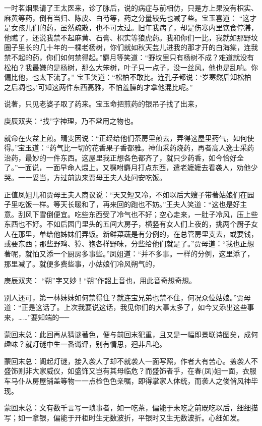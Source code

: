 \begin{parag}
    一时茗烟果请了王太医来，诊了脉后，说的病症与前相仿，只是方上果没有枳实、麻黄等药，倒有当归、陈皮、白芍等，药之分量较先也减了些。宝玉喜道： “这才是女孩儿们的药，虽然疏散，也不可太过。旧年我病了，却是伤寒内里饮食停滞，他瞧了，还说我禁不起麻黄、石膏、枳实等狼虎药。我和你们一比，我就如那野坟圈子里长的几十年的一棵老杨树，你们就如秋天芸儿进我的那才开的白海棠，连我禁不起的药，你们如何禁得起。”麝月等笑道：“野坟里只有杨树不成？难道就没有松柏？我最嫌的是杨树，那么大笨树，叶子只一点子，没一丝风，他也是乱响。你偏比他，也太下流了。” 宝玉笑道：“松柏不敢比。连孔子都说：‘岁寒然后知松柏之后凋也。’可知这两件东西高雅，不怕羞臊的才拿他混比呢。”
\end{parag}


\begin{parag}
    说著，只见老婆子取了药来。宝玉命把煎药的银吊子找了出来，\begin{note}庚辰双夹：“找”字神理，乃不常用之物也。\end{note}就命在火盆上煎。晴雯因说：“正经给他们茶房里煎去，弄得这屋里药气，如何使得。”宝玉道：“药气比一切的花香果子香都雅。神仙采药烧药，再者高人逸士采药治药，最妙的一件东西。这屋里我正想各色都齐了，就只少药香，如今恰好全了。”一面说，一面早命人煨上。又嘱咐麝月打点东西，遣老嬷嬷去看袭人，劝他少哭。一一妥当，方过前边来贾母王夫人处问安吃饭。
\end{parag}


\begin{parag}
    正值凤姐儿和贾母王夫人商议说：“天又短又冷，不如以后大嫂子带著姑娘们在园子里吃饭一样。等天长暖和了，再来回的跑也不妨。”王夫人笑道：“这也是好主意。刮风下雪倒便宜。吃些东西受了冷气也不好；空心走来，一肚子冷风，压上些东西也不好。不如后园门里头的五间大房子，横竖有女人们上夜的，挑两个厨子女人在那里，单给他姊妹们弄饭。新鲜菜蔬是有分例的，在总管房里支去，或要钱，或要东西；那些野鸡、獐、狍各样野味，分些给他们就是了。”贾母道：“我也正想著呢，就怕又添一个厨房多事些。”凤姐道：“并不多事。一样的分例，这里添了，那里减了。就便多费些事，小姑娘们冷风朔气的，\begin{note}庚辰双夹： “朔”字又妙！“朔”作韶上音也，用此音奇想奇想。\end{note}别人还可，第一林妹妹如何禁得住？就连宝兄弟也禁不住，何况众位姑娘。”贾母道：“正是这话了。上次我要说这话，我见你们的大事太多了，如今又添出这些事来，……”要知端的──
\end{parag}


\begin{parag}
    \begin{note}蒙回末总：此回再从猜谜著色，便与前回末犯重，且又是一幅即景联诗图矣，成何趣味？就灯谜中生一番谶评，别有情思，迥非凡艳。\end{note}
\end{parag}


\begin{parag}
    \begin{note}蒙回末总：阁起灯谜，接入袭人了却不就袭人一面写照，作者大有苦心。盖袭人不盛饰则非大家威仪，如盛饰又岂有其母临危？而盛饰者乎，在春(凤)姐一面，衣服车马仆从房屋铺盖等物一一点检色色亲嘱，即得掌家人体统，而袭人之俊俏风神毕现。\end{note}
\end{parag}


\begin{parag}
    \begin{note}蒙回末总：文有数千言写一琐事者，如一吃茶，偏能于未吃之前既吃以后，细细描写；如一拿银，偏能于开柜时生无数波折，平银时又生无数波折。心细如发。\end{note}
\end{parag}
